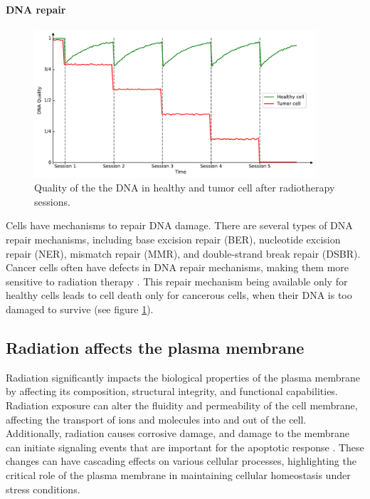 \paragraph{DNA repair}
\begin{figure}
	\centering
	\includegraphics[height=5.5cm]{_dna_quality.pdf}
	\caption{Quality of the the DNA in healthy and tumor cell after radiotherapy sessions.}
	\label{fig:dna_quality}
\end{figure}
Cells have mechanisms to repair DNA damage.
There are several types of DNA repair mechanisms, including base excision repair (BER), nucleotide excision repair (NER), mismatch repair (MMR), and double-strand break repair (DSBR).
Cancer cells often have defects in DNA repair mechanisms, making them more sensitive to radiation therapy \cite{Brierley2016}.
This repair mechanism being available only for healthy cells leads to cell death only for cancerous cells, when their DNA is too damaged to survive (see figure  \ref{fig:dna_quality}).

\subsection{Radiation affects the plasma membrane}
Radiation significantly impacts the biological properties of the plasma membrane by affecting its composition, structural integrity, and functional capabilities.
Radiation exposure can alter the fluidity and permeability of the cell membrane, affecting the transport of ions and molecules into and out of the cell.
Additionally, radiation causes corrosive damage, and damage to the membrane can initiate signaling events that are important for the apoptotic response \cite{CohenJonathan1999}.
These changes can have cascading effects on various cellular processes, highlighting the critical role of the plasma membrane in maintaining cellular homeostasis under stress conditions.

